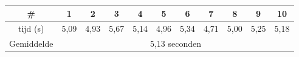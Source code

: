 \begin{tabular}{ |c| |c |c |c |c |c |c |c |c |c |c| }
\hline
	\# & 1 & 2 & 3 & 4 & 5 & 6 & 7 & 8 & 9 & 10\\
\hline
	tijd (s) & 5,09 & 4,93 & 5,67 & 5,14 & 4,96 & 5,34 & 4,71 & 5,00 & 5,25 & 5,18\\
\hline
 Gemiddelde & \multicolumn{10}{c|}{5,13 seconden}\\
\hline
\end{tabular}


